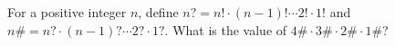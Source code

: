 For a positive integer $n$, define $n?=n!\cdot(n-1)!\cdots2!\cdot1!$ and $n\#=n?\cdot(n-1)?\cdots2?\cdot1?$. What is the value of $4\#\cdot3\#\cdot2\#\cdot1\#$?
